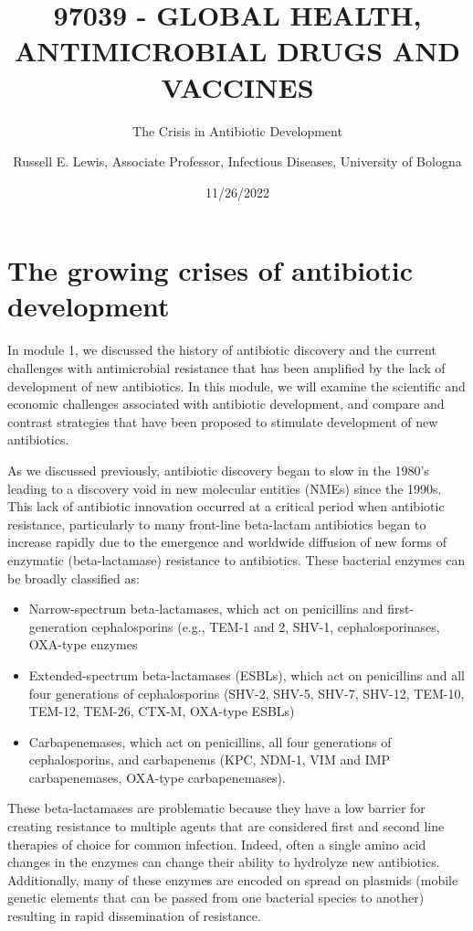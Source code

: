 \documentclass[
]{book}
\title{97039 - GLOBAL HEALTH, ANTIMICROBIAL DRUGS AND VACCINES}
\subtitle{The Crisis in Antibiotic Development}
\author{Russell E. Lewis, Associate Professor, Infectious Diseases, University of Bologna}
\date{11/26/2022}
\providecommand{\tightlist}{%
  \setlength{\itemsep}{0pt}\setlength{\parskip}{0pt}}
\begin{document}
\maketitle

{
\setcounter{tocdepth}{1}
\tableofcontents
}
\hypertarget{the-growing-crises-of-antibiotic-development}{%
\section*{The growing crises of antibiotic development}\label{the-growing-crises-of-antibiotic-development}}

In module 1, we discussed the history of antibiotic discovery and the current challenges with antimicrobial resistance that has been amplified by the lack of development of new antibiotics. In this module, we will examine the scientific and economic challenges associated with antibiotic development, and compare and contrast strategies that have been proposed to stimulate development of new antibiotics.

As we discussed previously, antibiotic discovery began to slow in the 1980's leading to a discovery void in new molecular entities (NMEs) since the 1990s. This lack of antibiotic innovation occurred at a critical period when antibiotic resistance, particularly to many front-line beta-lactam antibiotics began to increase rapidly due to the emergence and worldwide diffusion of new forms of enzymatic (beta-lactamase) resistance to antibiotics. These bacterial enzymes can be broadly classified as:

\begin{itemize}
\tightlist
\item
  Narrow-spectrum beta-lactamases, which act on penicillins and first-generation cephalosporins (e.g., TEM-1 and 2, SHV-1, cephalosporinases, OXA-type enzymes
\item
  Extended-spectrum beta-lactamases (ESBLs), which act on penicillins and all four generations of cephalosporins (SHV-2, SHV-5, SHV-7, SHV-12, TEM-10, TEM-12, TEM-26, CTX-M, OXA-type ESBLs)
\item
  Carbapenemases, which act on penicillins, all four generations of cephalosporins, and carbapenems (KPC, NDM-1, VIM and IMP carbapenemases, OXA-type carbapenemases).
\end{itemize}

These beta-lactamases are problematic because they have a low barrier for creating resistance to multiple agents that are considered first and second line therapies of choice for common infection. Indeed, often a single amino acid changes in the enzymes can change their ability to hydrolyze new antibiotics. Additionally, many of these enzymes are encoded on spread on plasmids (mobile genetic elements that can be passed from one bacterial species to another) resulting in rapid dissemination of resistance.
\end{document}
